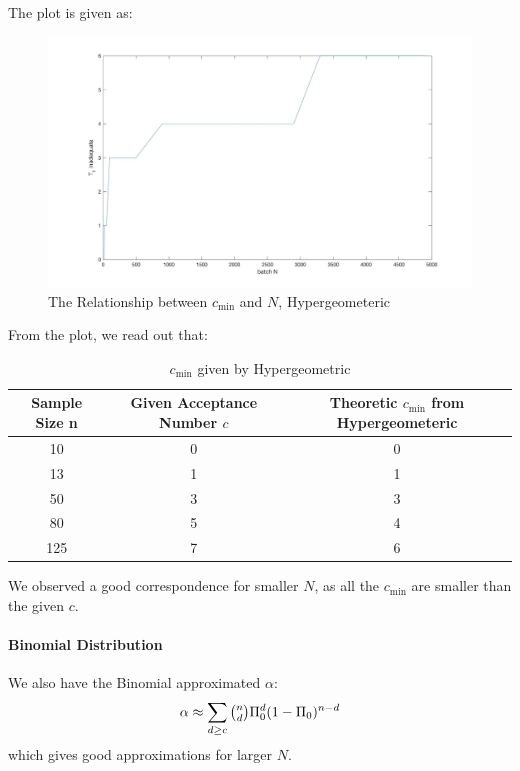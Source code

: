 \documentclass[a4paper]{article}
\begin{document}
The plot is given as:
\begin{figure}[!htbp] 
\centering 
\includegraphics[width=1\linewidth]{alpha-hyper.jpg}  
\caption{The Relationship between $c_{\min}$ and $N$, Hypergeometeric} 
\end{figure}

From the plot, we read out that:
\begin{table}[!htbp]
  \centering
    \begin{tabular}{ccc}
    \hline
    Sample Size n & Given Acceptance Number $c$ & Theoretic $c_{\min}$ from Hypergeometeric \\
    \hline
    10    & 0     & 0 \\
    13    & 1     & 1 \\
    50    & 3     & 3 \\
    80    & \cellcolor[rgb]{ .851,  .882,  .949}5 & \cellcolor[rgb]{ .851,  .882,  .949}4 \\
    125   & \cellcolor[rgb]{ .851,  .882,  .949}7 & \cellcolor[rgb]{ .851,  .882,  .949}6 \\
    \hline
    \end{tabular}%
    \caption{$c_{\min}$ given by Hypergeometric}
\end{table}%

We observed a good correspondence for smaller $N$, as all the $c_{\min}$ are smaller than the given $c$.

\newpage

\paragraph{Binomial Distribution}
We also have the Binomial approximated $\alpha$:
$$\alpha \approx \sum_{d\geq c}\tbinom{n}{d}\Pi_0^d(1-\Pi_0)^{n-d}$$
which gives good approximations for larger $N$.
\end{document}
